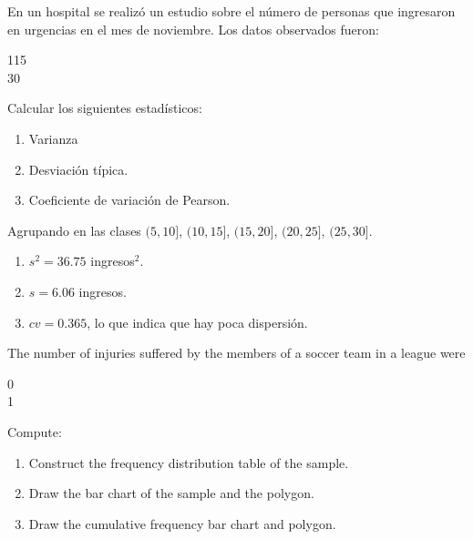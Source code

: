 {En un hospital se realizó un estudio sobre el número de personas que ingresaron en urgencias en el mes de noviembre. Los datos observados fueron:
\begin{center}
115               \\
30              
\end{center}
Calcular los siguientes estadísticos:
\begin{enumerate}
\item Varianza
\item Desviación típica.
\item Coeficiente de variación de Pearson.
\end{enumerate}
}
{
Agrupando en las clases $(5,10]$, $(10,15]$, $(15,20]$, $(20,25]$, $(25,30]$.
\begin{enumerate}
\item $s^2 = 36.75$ ingresos$^2$.
\item $s=6.06$ ingresos.
\item $cv=0.365$, lo que indica que hay poca dispersión.
\end{enumerate}
}
{}


{The number of injuries suffered by the members of a soccer team in a league were
\begin{center}
0            \\
1           
\end{center}

Compute:
\begin{enumerate}
\item Construct the frequency distribution table of the sample.
\item Draw the bar chart of the sample and the polygon.
\item Draw the cumulative frequency bar chart and polygon.
\end{enumerate}
}
{
}
{}


